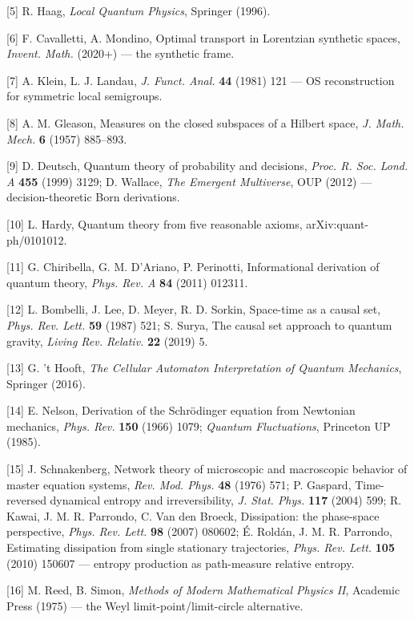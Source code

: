\documentclass[11pt]{article}
\begin{document}
[5] R. Haag, \emph{Local Quantum Physics}, Springer (1996).

[6] F. Cavalletti, A. Mondino, Optimal transport in Lorentzian synthetic spaces, \emph{Invent. Math.} (2020+) — the synthetic frame.

[7] A. Klein, L. J. Landau, \emph{J. Funct. Anal.} \textbf{44} (1981) 121 — OS reconstruction for symmetric local semigroups.

[8] A. M. Gleason, Measures on the closed subspaces of a Hilbert space, \emph{J. Math. Mech.} \textbf{6} (1957) 885–893.

[9] D. Deutsch, Quantum theory of probability and decisions, \emph{Proc. R. Soc. Lond. A} \textbf{455} (1999) 3129; D. Wallace, \emph{The Emergent Multiverse}, OUP (2012) — decision-theoretic Born derivations.

[10] L. Hardy, Quantum theory from five reasonable axioms, arXiv:quant-ph/0101012.

[11] G. Chiribella, G. M. D'Ariano, P. Perinotti, Informational derivation of quantum theory, \emph{Phys. Rev. A} \textbf{84} (2011) 012311.

[12] L. Bombelli, J. Lee, D. Meyer, R. D. Sorkin, Space-time as a causal set, \emph{Phys. Rev. Lett.} \textbf{59} (1987) 521; S. Surya, The causal set approach to quantum gravity, \emph{Living Rev. Relativ.} \textbf{22} (2019) 5.

[13] G. 't Hooft, \emph{The Cellular Automaton Interpretation of Quantum Mechanics}, Springer (2016).

[14] E. Nelson, Derivation of the Schrödinger equation from Newtonian mechanics, \emph{Phys. Rev.} \textbf{150} (1966) 1079; \emph{Quantum Fluctuations}, Princeton UP (1985).

[15] J. Schnakenberg, Network theory of microscopic and macroscopic behavior of master equation systems, \emph{Rev. Mod. Phys.} \textbf{48} (1976) 571; P. Gaspard, Time-reversed dynamical entropy and irreversibility, \emph{J. Stat. Phys.} \textbf{117} (2004) 599; R. Kawai, J. M. R. Parrondo, C. Van den Broeck, Dissipation: the phase-space perspective, \emph{Phys. Rev. Lett.} \textbf{98} (2007) 080602; É. Roldán, J. M. R. Parrondo, Estimating dissipation from single stationary trajectories, \emph{Phys. Rev. Lett.} \textbf{105} (2010) 150607 — entropy production as path-measure relative entropy.

[16] M. Reed, B. Simon, \emph{Methods of Modern Mathematical Physics II}, Academic Press (1975) — the Weyl limit-point/limit-circle alternative.
\end{document}
